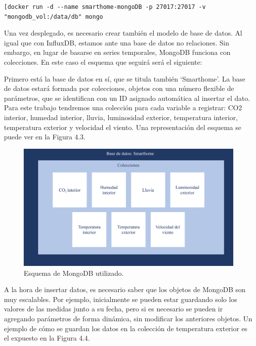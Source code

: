 \begin{lstlisting}[docker run -d --name smarthome-mongoDB -p 27017:27017 -v "mongodb_vol:/data/db" mongo
\end{lstlisting}

Una vez desplegado, es necesario crear también el modelo de base de datos. Al igual que con InfluxDB, estamos ante una base de datos no relaciones. Sin embargo, en lugar de basarse en series temporales, MongoDB funciona con colecciones. En este caso el esquema que seguirá será el siguiente:

Primero está la base de datos en sí, que se titula también ‘Smarthome’. La base de datos estará formada por colecciones, objetos con una número flexible de parámetros, que se identifican con un ID asignado automática al insertar el dato. Para este trabajo tendremos una colección para cada variable a registrar: CO2 interior, humedad interior, lluvia, luminosidad exterior, temperatura interior, temperatura exterior y velocidad el viento. Una representación del esquema se puede ver en la Figura 4.3.

\begin{figure}[h]
    \centering
    \includegraphics[width=17cm]{imagenes/capitulo4/esquemaMongoBD.png}
    \caption{Esquema de MongoDB utilizado.}
    \label{fig:esquema_influxdb}
\end{figure}

A la hora de insertar datos, es necesario saber que los objetos de MongoDB son muy escalables. Por ejemplo, inicialmente se pueden estar guardando solo los valores de las medidas junto a su fecha, pero si es necesario se pueden ir agregando parámetros de forma dinámica, sin modificar los anteriores objetos. Un ejemplo de cómo se guardan los datos en la colección de temperatura exterior es el expuesto en la Figura 4.4.

